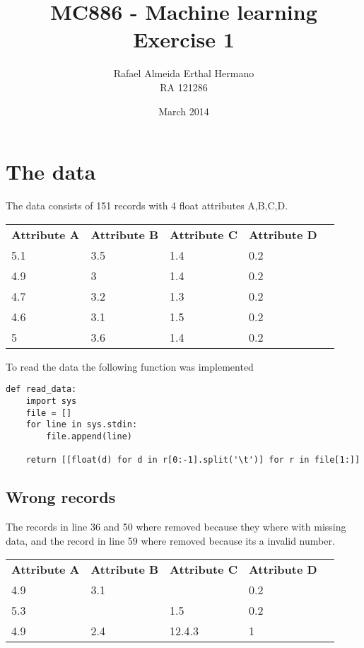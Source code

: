 \documentclass{article}
\title{MC886 - Machine learning \\ Exercise 1}
\author{Rafael Almeida Erthal Hermano\\RA 121286}
\date{March 2014}
\begin{document}
\maketitle
\newpage

\section{The data}

The data consists of 151 records with 4 float attributes A,B,C,D.

\begin{table}[h]
    \begin{tabular}{|l|l|l|l|l}
        \cline{1-4}
        \textbf{Attribute A} & \textbf{Attribute B} & \textbf{Attribute C} & \textbf{Attribute D} &  \\ \cline{1-4}
        5.1 & 3.5 & 1.4 & 0.2 \\ \cline{1-4}
        4.9 & 3   & 1.4 & 0.2 \\ \cline{1-4}
        4.7 & 3.2 & 1.3 & 0.2 \\ \cline{1-4}
        4.6 & 3.1 & 1.5 & 0.2 \\ \cline{1-4}
        5   & 3.6 & 1.4 & 0.2 \\ \cline{1-4}
    \end{tabular}
\end{table}

To read the data the following function was implemented

\begin{lstlisting}
def read_data:
    import sys
    file = []
    for line in sys.stdin:
        file.append(line)
        
    return [[float(d) for d in r[0:-1].split('\t')] for r in file[1:]]
\end{lstlisting}

\subsection{Wrong records}
The records in line 36 and 50 where removed because they where with missing data, and the record in line 59 where removed because its a invalid number.

\begin{table}[h]
    \begin{tabular}{|l|l|l|l|l}
        \cline{1-4}
        \textbf{Attribute A} & \textbf{Attribute B} & \textbf{Attribute C} & \textbf{Attribute D} &  \\ \cline{1-4}
        4.9 & 3.1 & & 0.2 \\ \cline{1-4}
        5.3 & & 1.5 & 0.2 \\ \cline{1-4}
        4.9 & 2.4 & 12.4.3 & 1 \\ \cline{1-4}
    \end{tabular}
\end{table}
\end{document}
